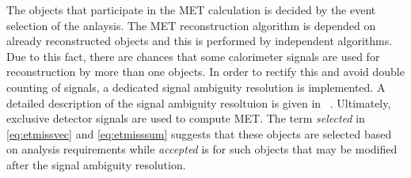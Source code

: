 The objects that participate in the MET calculation is decided by the event selection of the anlaysis. The MET reconstruction algorithm is depended on already reconstructed
objects and this is performed by independent algorithms. Due to this fact, there are chances that some calorimeter signals are used for reconstruction by more than one
objects. In order to rectify this and avoid double counting of signals, a dedicated signal ambiguity resolution is implemented. 
A detailed description of the signal ambiguity resoltuion is given in ~\cite{CERN-EP-2024-023}.
Ultimately, exclusive detector signals are used to compute MET. The term \textit{selected} in \cref{eq:etmissvec} and \cref{eq:etmisssum} suggests 
that these objects are selected based on analysis requirements while \textit{accepted} 
is for such objects that may be modified after the signal ambiguity resolution. 



